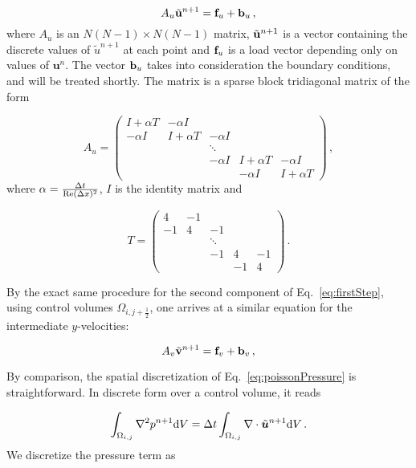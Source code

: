 \documentclass[final,3p,twocolumn]{elsarticle}
\begin{document}
\begin{equation}
    A_u \tilde{\bf u}^{n+1} = {\bf f}_u + {\bf b}_u \,,
    \label{eq:xVelocityMatrix}
\end{equation}
%
where $A_u$ is an $N(N-1) \times N(N-1)$ matrix, $\tilde{\bf u}^{n+1}$ is a
vector containing the discrete values of $\tilde{u}^{n+1}$ at each point and ${\bf f}_u$ is a
load vector depending only on values of $\bm{u}^n$. The
vector ${\bf b}_u$ takes into consideration the boundary conditions, and
will be treated shortly. The matrix is a sparse block tridiagonal matrix of the
form

\begin{equation*}
    A_u = 
    \begin{pmatrix}
        I + \alpha T & -\alpha I \\
        -\alpha I & I + \alpha T & -\alpha I \\
        & & \ddots \\
        & & -\alpha I & I + \alpha T & -\alpha I \\
        & & & -\alpha I & I + \alpha T
    \end{pmatrix} \,,
\end{equation*}
%
where $\alpha = \frac{\Delta t}{{\rm Re}(\Delta x)^2}$, $I$ is the identity
matrix and

\begin{equation*}
    T = 
    \begin{pmatrix}
        4 & -1 \\
        -1 & 4 & -1 \\
        & & \ddots \\ 
        & & -1 & 4 & -1 \\
        & & & -1 & 4
    \end{pmatrix} \,.
\end{equation*}

By the exact same procedure for the second component of Eq.\
\eqref{eq:firstStep}, using control volumes $\Omega_{i,j+\frac{1}{2}}$, one
arrives at a similar equation for the intermediate $y$-velocities: 

\begin{equation}
    A_v \tilde{\bf v}^{n+1} = {\bf f}_v + {\bf b}_v \,,
    \label{eq:yVelocityMatrix}
\end{equation}

By comparison, the spatial discretization of Eq.\ \eqref{eq:poissonPressure} is
straightforward. In discrete form over a control volume, it reads 

\begin{equation}
    \int_{\Omega_{i,j}} \nabla^2 p^{n+1} {\rm d}V = \Delta t
    \int_{\Omega_{i,j}} \nabla \cdot \tilde{\bm{u}}^{n+1} {\rm d}V \,.
\end{equation}
%
We discretize the pressure term as 
\end{document}
